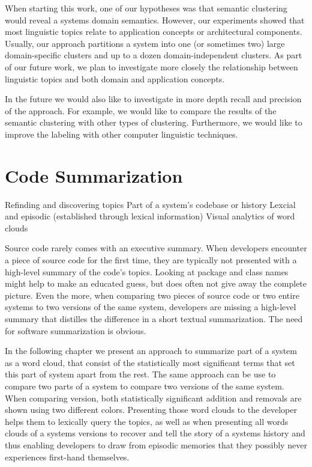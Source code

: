 \documentclass[10pt]{book}
\begin{document}
When starting this work, one of our hypotheses was that semantic clustering would reveal a systems domain semantics. However, our experiments showed that most linguistic topics relate to application concepts or architectural components. Usually, our approach partitions a system into one (or sometimes two) large domain-specific clusters and up to a dozen domain-independent clusters. As part of our future work, we plan to investigate more closely the relationship between linguistic topics and both domain and application concepts.

In the future we would also like to investigate in more depth recall and precision of the approach. For example, we would like to compare the results of the semantic clustering with other types of clustering. Furthermore, we would like to improve the labeling with other computer linguistic techniques.


\chapter{Code Summarization}
\label{the chapter on LogLR}

\infobox
	{Refinding and discovering topics}
	{Part of a system's codebase or history}
	{Lexcial and episodic (established through lexical information)}
	{Visual analytics of word clouds}

Source code rarely comes with an executive summary. When developers encounter a piece of source code for the first time, they are typically not presented with a high-level summary of the code's topics. Looking at package and class names might help to make an educated guess, but does often not give away the complete picture. Even the more, when comparing two pieces of source code or two entire systems to two versions of the same system, developers are missing a high-level summary that distilles the difference in a short textual summarization. The need for software summarization is obvious.

In the following chapter we present an approach to summarize part of a system as a word cloud, that consist of the statistically most significant terms that set this part of system apart from the rest. The same approach can be use to compare two parts of a system to compare two versions of the same system. When comparing version, both statistically significant addition and removals are shown using two different colors. Presenting those word clouds to the developer helps them to lexically query the topics, as well as when presenting all words clouds of a systems versions to recover and tell the story of a systems history and thus enabling developers to draw from episodic memories that they possibly never experiences first-hand themselves.
\end{document}
